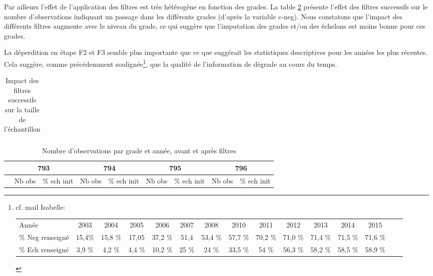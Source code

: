 \documentclass[11pt,a4paper]{article}
\begin{document}
Par ailleurs l'effet de l'application des filtres est très hétérogène en fonction des grades. La table \ref{count_AT} présente l'effet des filtres successifs sur le nombre d'observations indiquant un passage dans les différents grades (d'après la variable c-neg). Nous constatons que l'impact des différents filtres augmente avec le niveau du grade, ce qui suggère que l'imputation des grades et/ou des échelons est moins bonne pour ces grades. 

La déperdition en étape F2 et F3 semble plus importante que ce que suggérait les statistiques descriptives pour les années les plus récentes. Cela suggère, comme précédemment soulignée\footnote{cf. mail Isabelle:  \\
\scriptsize
\begin{tabular}{lcccccccccccccc}
Année &2003&	2004 &	2005&	2006&	2007&	2008	&2010	&2011	&2012	&2013	&2014	&2015 \\
\% Neg renseigné & 15,4\%&	15,8 \% &	17,05	& 37,2 \%	&51,4 &	53,4 \% &	57,7 \%&	70,2 \%&	71,0 \% & 	71,4 \%	&71,5 \%&	71,6 \% \\
\% Ech renseigné &  3,9 \%	& 4,2 \%&	4,4 \%	&10,2 \% 	&25 \%	&24 \%	&33,5 \% &	54 \%&	56,3 \%&	58,2 \%	&58,5 \%	&58,9 \% \\
\end{tabular}
}, que la qualité de l'information de dégrade au cours du temps. 


\begin{table}[h!]
\centering
\caption{Impact des filtres successifs sur la taille de l'échantillon} 
\label{filters_AT}
\begin{tabular}{lcc}
\toprule

\bottomrule
\end{tabular}
\end{table}


\begin{table}[h!]
\centering
\caption{Nombre d'observations par grade et année, avant et après filtres} 
\label{count_AT}
\begin{tabular}{lcc|cc|cc|cc}
\toprule
 & \multicolumn{2}{c}{793} & \multicolumn{2}{c}{794} & 		  	   \multicolumn{2}{c}{795} & \multicolumn{2}{c}{796} \\
 \midrule
 & Nb obs & \% ech init  & Nb obs & \% ech init & Nb obs & \% ech init & Nb obs & \% ech init  \\

\bottomrule
\end{tabular}
\end{table}
\end{document}
